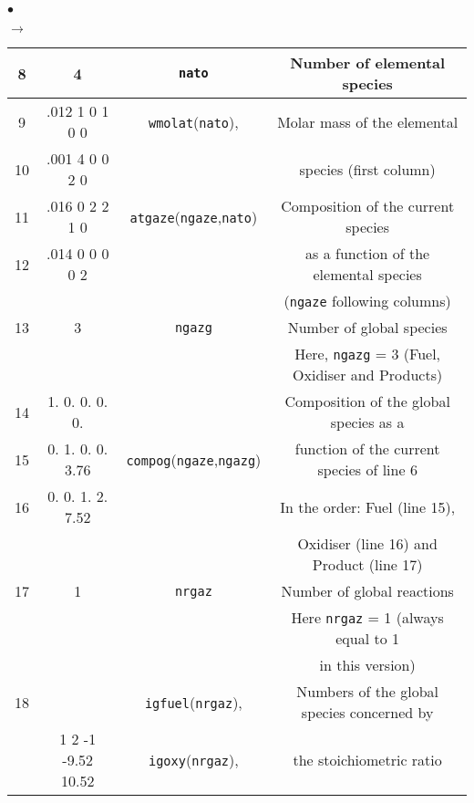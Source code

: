{{{\begin{list}{$\bullet$}{}
\begin{list}{$\rightarrow$}{}
\begin{table}[htbp]
\begin{center}
{\begin{tabular}{|c|c|c|c|}
  8     &         4         &  \texttt{nato\index{nato}}   & Number of elemental species                      \\ \hline
  9     &.012  1  0  1  0  0& \texttt{wmolat\index{wmolat}}(\texttt{nato}),  & Molar mass of the elemental                      \\
 10     &.001  4  0  0  2  0&                              & species (first column)                           \\
 11     &.016  0  2  2  1  0&\texttt{atgaze\index{atgaze}}(\texttt{ngaze},\texttt{nato})& Composition of the current species             \\
 12     &.014  0  0  0  0  2&                              & as a function of the elemental species           \\
        &                   &                              & (\texttt{ngaze} following columns)                        \\ \hline
 13     &         3         &  \texttt{ngazg\index{ngazg}} & Number of global species                         \\
        &                   &                              & Here, \texttt{ngazg} = 3 (Fuel, Oxidiser and Products)    \\ \hline
 14     &  1. 0. 0. 0. 0.   &                              & Composition of the global species as a           \\
 15     &  0. 1. 0. 0. 3.76 &\texttt{compog\index{compog}}(\texttt{ngaze},\texttt{ngazg})& function of the current species of line 6 \\
 16     &  0. 0. 1. 2. 7.52 &                              & In the order: Fuel (line 15),                    \\
        &                   &                              & Oxidiser (line 16) and Product (line 17)         \\ \hline
 17     &         1         &  \texttt{nrgaz\index{nrgaz}} & Number of global reactions                       \\
        &                   &                              & Here \texttt{nrgaz} = 1 (always equal to 1                \\
        &                   &                              & in this version)                                 \\ \hline
 18     &                   & \texttt{igfuel\index{igfuel}}(\texttt{nrgaz}), & Numbers of the global species concerned by       \\
        & 1 2 -1 -9.52 10.52&  \texttt{igoxy\index{igoxy}}(\texttt{nrgaz}),  & the stoichiometric ratio                         \\

\end{tabular}}
\end{center}
\end{table}
\end{list}
\end{list}}}}
